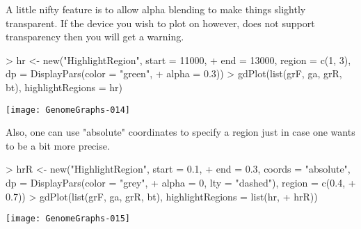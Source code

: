 \documentclass[11pt]{article}
\begin{document}
A little nifty feature is to allow alpha blending to make things
slightly transparent. If the device you wish to plot on however, does
not support transparency then you will get a warning. 

\begin{Schunk}
\begin{Sinput}
> hr <- new("HighlightRegion", start = 11000, 
+     end = 13000, region = c(1, 3), dp = DisplayPars(color = "green", 
+         alpha = 0.3))
> gdPlot(list(grF, ga, grR, bt), highlightRegions = hr)
\end{Sinput}
\end{Schunk}
\texttt{[image: GenomeGraphs-014]}

Also, one can use "absolute" coordinates to specify a region just in
case one wants to be a bit more precise. 
\begin{Schunk}
\begin{Sinput}
> hrR <- new("HighlightRegion", start = 0.1, 
+     end = 0.3, coords = "absolute", dp = DisplayPars(color = "grey", 
+         alpha = 0, lty = "dashed"), region = c(0.4, 
+         0.7))
> gdPlot(list(grF, ga, grR, bt), highlightRegions = list(hr, 
+     hrR))
\end{Sinput}
\end{Schunk}
\texttt{[image: GenomeGraphs-015]}
\end{document}

